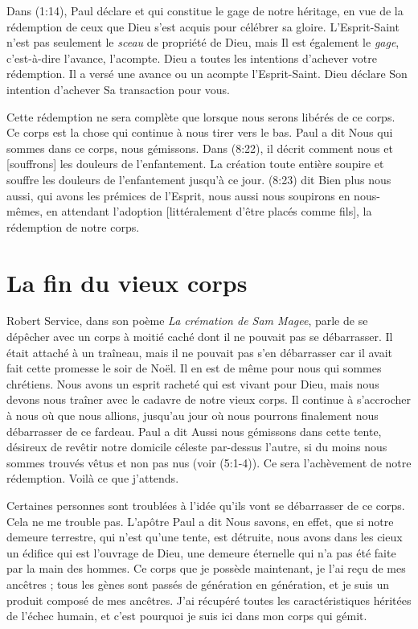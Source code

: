 Dans (1:14), Paul déclare\frcolon{}
 \Og [\dots{}] et qui constitue le gage de notre héritage,
 en vue de la rédemption de ceux que Dieu s'est acquis
 pour célébrer sa gloire. \Fg{}
 L'Esprit-Saint n'est pas seulement le \emph{sceau} de propriété de Dieu,
 mais Il est également le \emph{gage}, c'est-à-dire l'avance, l'acompte.
 Dieu a toutes les intentions d'achever votre rédemption.
 Il a versé une avance ou un acompte\frcolon{} l'Esprit-Saint.
 Dieu déclare Son intention d'achever Sa transaction pour vous.

Cette rédemption ne sera complète que lorsque nous serons libérés
 de ce corps.
 Ce corps est la chose qui continue à nous tirer vers le bas.
 Paul a dit\frcolon{}
 \Og Nous qui sommes dans ce corps, nous gémissons. \Fg{}
 Dans (8:22), il décrit comment nous
 \Og [soupirons] et [souffrons] les douleurs de l'enfantement. \Fg{}
 La création toute entière soupire et souffre
 les douleurs de l'enfantement jusqu'à ce jour.
 (8:23) dit\frcolon{}
 \Og Bien plus\frcolon{} nous aussi, qui avons les prémices de l'Esprit,
 nous aussi nous soupirons en nous-mêmes, en attendant l'adoption
 [littéralement\frcolon{} d'être placés comme fils],
 la rédemption de notre corps. \Fg{}


\section{La fin du vieux corps}

Robert Service, dans son poème \emph{La crémation de Sam Magee},
 parle de se dépêcher \Og avec un corps à moitié caché
 dont il ne pouvait pas se débarrasser. \Fg{}
 Il était attaché à un traîneau, mais il ne pouvait pas s'en débarrasser
 car il avait fait cette promesse le soir de Noël.
 Il en est de même pour nous qui sommes chrétiens.
 Nous avons un esprit racheté qui est vivant pour Dieu,
 mais nous devons nous traîner avec le cadavre de notre vieux corps.
 Il continue à s'accrocher à nous où que nous allions, jusqu'au jour où nous pourrons
 finalement nous débarrasser de ce fardeau. Paul a dit\frcolon{}
 \Og Aussi nous gémissons dans cette tente, désireux de revêtir
 notre domicile céleste par-dessus l'autre, si du moins nous sommes
 trouvés vêtus et non pas nus \Fg{} (voir (5:1-4)).
 Ce sera l'achèvement de notre rédemption. Voilà ce que j'attends.

Certaines personnes sont troublées
 à l'idée qu'ils vont se débarrasser de ce corps. Cela ne me trouble pas.
 L'apôtre Paul a dit\frcolon{}
 \Og  Nous savons, en effet, que si notre demeure terrestre,
 qui n'est qu'une tente, est détruite, nous avons dans les cieux
 un édifice qui est l'ouvrage de Dieu, une demeure éternelle
 qui n'a pas été faite par la main des hommes. \Fg{}
 Ce corps que je possède maintenant, je l'ai reçu de mes ancêtres ;
 tous les gènes sont passés de génération en génération,
 et je suis un produit composé de mes ancêtres.
 J'ai récupéré toutes les caractéristiques héritées de l'échec humain,
 et c'est pourquoi je suis ici dans mon corps qui gémit.



